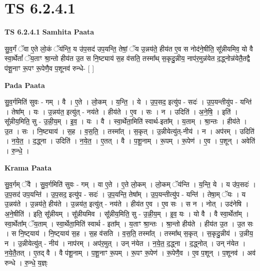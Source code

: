 \documentclass[17pt]{extarticle}
\begin{document}
\section{ TS 6.2.4.1 }

\textbf{TS 6.2.4.1 } \newline
\textbf{Samhita Paata} \newline

सु॒व॒र्गं ॅवा ए॒ते लो॒कं ॅय॑न्ति॒ य उ॑प॒सद॑ उप॒यन्ति॒ तेषां॒ ॅय उ॒न्नय॑ते॒ हीय॑त ए॒व स नोद॑ने॒षीति॒ सू᳚न्नीयमिव॒ यो वै स्वा॒र्थेतां᳚ ॅय॒ताꣳ श्रा॒न्तो हीय॑त उ॒त स नि॒ष्ट्याय॑ स॒ह व॑सति॒ तस्मा᳚थ् स॒कृदु॒न्नीय॒ नाप॑र॒मुन्न॑येत द॒द्ध्नोन्न॑येतै॒तद्वै प॑शू॒नाꣳ रू॒पꣳ रू॒पेणै॒व प॒शूनव॑ रुन्धे- [  ] \newline

\textbf{Pada Paata} \newline

सु॒व॒र्गमिति॑ सुवः - गम् । वै । ए॒ते । लो॒कम् । य॒न्ति॒ । ये । उ॒प॒सद॒ इत्यु॑प - सदः॑ । उ॒प॒यन्तीयु॑प - यन्ति॑ । तेषा᳚म् । यः । उ॒न्नय॑त॒ इत्यु॑त् - नय॑ते । हीय॑ते । ए॒व । सः । न । उदिति॑ । अ॒ने॒षि॒ । इति॑ । सू᳚न्नीय॒मिति॒ सु - उ॒न्नी॒य॒म् । इ॒व॒ । यः । वै । स्वा॒र्थेता॒मिति॑ स्वार्थ-इता᳚म् । य॒ताम् । श्रा॒न्तः । हीय॑ते । उ॒त । सः । नि॒ष्ट्याय॑ । स॒ह । व॒स॒ति॒ । तस्मा᳚त् । स॒कृत् । उ॒न्नीयेत्यु॑त्-नीय॑ । न । अप॑रम् । उदिति॑ । न॒ये॒त॒ । द॒द्ध्ना । उदिति॑ । न॒ये॒त॒ । ए॒तत् । वै । प॒शू॒नाम् । रू॒पम् । रू॒पेण॑ । ए॒व । प॒शून् । अवेति॑ । रु॒न्धे॒ ।  \newline


\textbf{Krama Paata} \newline

सु॒व॒र्गम् ॅवै । सु॒व॒र्गमिति॑ सुवः - गम् । वा ए॒ते । ए॒ते लो॒कम् । लो॒कम् ॅय॑न्ति । य॒न्ति॒ ये । य उ॑प॒सदः॑ । उ॒प॒सद॑ उप॒यन्ति॑ । उ॒प॒सद॒ इत्यु॑प - सदः॑ । उ॒प॒यन्ति॒ तेषा᳚म् । उ॒प॒यन्तीत्यु॑प - यन्ति॑ । तेषा॒म् ॅयः । य उ॒न्नय॑ते । उ॒न्नय॑ते॒ हीय॑ते । उ॒न्नय॑त॒ इत्यु॑त् - नय॑ते । हीय॑त ए॒व । ए॒व सः । स न । नोत् । उद॑नेषि । अ॒ने॒षीति॑ । इति॒ सू᳚न्नीयम् । सू᳚न्नीयमिव । सू᳚न्नीय॒मिति॒ सु - उ॒न्नी॒य॒म् । इ॒व॒ यः । यो वै । वै स्वा॒र्थेता᳚म् । स्वा॒र्थेता᳚म् ॅय॒ताम् । स्वा॒र्थेता॒मिति॑ स्वार्थ - इता᳚म् । य॒ताꣳ श्रा॒न्तः । श्रा॒न्तो हीय॑ते । हीय॑त उ॒त । उ॒त सः । स नि॒ष्ट्‍याय॑ । नि॒ष्ट्‍याय॑ स॒ह । स॒ह व॑सति । व॒स॒ति॒ तस्मा᳚त् । तस्मा᳚थ् स॒कृत् । स॒कृदु॒न्नीय॑ । उ॒न्नीय॒ न । उ॒न्नीयेत्यु॑त् - नीय॑ । नाप॑रम् । अप॑र॒मुत् । उन् न॑येत । न॒ये॒त॒ द॒द्ध्ना । द॒द्ध्नोत् । उन् न॑येत । न॒ये॒तै॒तत् । ए॒तद् वै । वै प॑शू॒नाम् । प॒शू॒नाꣳ रू॒पम् । रू॒पꣳ रू॒पेण॑ । रू॒पेणै॒व । ए॒व प॒शून् । प॒शूनव॑ । अव॑ रुन्धे । रु॒न्धे॒ य॒ज्ञ्ः \newline
\end{document}

